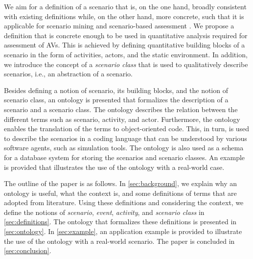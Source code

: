We aim for a definition of a scenario that is, on the one hand, broadly consistent with existing definitions \cite{geyer2014, ulbrich2015, elrofai2016scenario} while, on the other hand, more concrete, such that it is applicable for scenario mining \cite{elrofai2016scenario} and scenario-based assessment \cite{stellet2015taxonomy, deGelder2017assessment}. We propose a definition that is concrete enough to be used in quantitative analysis required for assessment of AVs. This is achieved by defining quantitative building blocks of a scenario in the form of activities, actors, and the static environment. In addition, we introduce the concept of a \emph{scenario class} that is used to qualitatively describe scenarios, i.e., an abstraction of a scenario. 

\cbstartb
Besides defining a notion of scenario, its building blocks, and the notion of scenario class, an ontology is presented that formalizes the description of a scenario and a scenario class. 
The ontology describes the relation between the different terms such as scenario, activity, and actor.
Furthermore, the ontology enables the translation of the terms to object-oriented code.
This, in turn, is used to describe the scenarios in a coding language that can be understood by various software agents, such as simulation tools.
The ontology is also used as a schema for a database system for storing the scenarios and scenario classes.
An example is provided that illustrates the use of the ontology with a real-world case.
\cbend

The outline of the paper is as follows. In \cref{sec:background}, we explain why an ontology is useful, what the context is, and some definitions of terms that are adopted from literature. 
Using these definitions and considering the context, we define the notions of \emph{scenario}, \emph{event}, \emph{activity}, and \emph{scenario class} in \cref{sec:definitions}. 
The ontology that formalizes these definitions is presented in \cref{sec:ontology}. 
In \cref{sec:example}, an application example is provided to illustrate the use of the ontology with a real-world scenario. 
The paper is concluded in \cref{sec:conclusion}.
